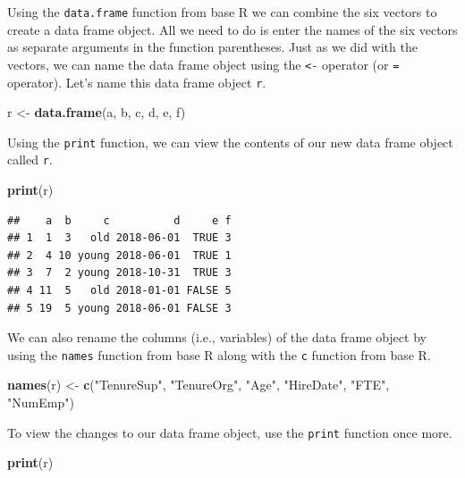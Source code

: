 \documentclass[]{book}
\newenvironment{Shaded}{\begin{snugshade}}{\end{snugshade}}
\newcommand{\KeywordTok}[1]{\textcolor[rgb]{0.13,0.29,0.53}{\textbf{#1}}}
\newcommand{\StringTok}[1]{\textcolor[rgb]{0.31,0.60,0.02}{#1}}
\newcommand{\NormalTok}[1]{#1}
\begin{document}
Using the \texttt{data.frame} function from base R we can combine the
six vectors to create a data frame object. All we need to do is enter
the names of the six vectors as separate arguments in the function
parentheses. Just as we did with the vectors, we can name the data frame
object using the \texttt{\textless{}-} operator (or \texttt{=}
operator). Let's name this data frame object \texttt{r}.

\begin{Shaded}
\begin{Highlighting}[]
\NormalTok{r <-}\StringTok{ }\KeywordTok{data.frame}\NormalTok{(a, b, c, d, e, f)}
\end{Highlighting}
\end{Shaded}

Using the \texttt{print} function, we can view the contents of our new
data frame object called \texttt{r}.

\begin{Shaded}
\begin{Highlighting}[]
\KeywordTok{print}\NormalTok{(r)}
\end{Highlighting}
\end{Shaded}

\begin{verbatim}
##    a  b     c          d     e f
## 1  1  3   old 2018-06-01  TRUE 3
## 2  4 10 young 2018-06-01  TRUE 1
## 3  7  2 young 2018-10-31  TRUE 3
## 4 11  5   old 2018-01-01 FALSE 5
## 5 19  5 young 2018-06-01 FALSE 3
\end{verbatim}

We can also rename the columns (i.e., variables) of the data frame
object by using the \texttt{names} function from base R along with the
\texttt{c} function from base R.

\begin{Shaded}
\begin{Highlighting}[]
\KeywordTok{names}\NormalTok{(r) <-}\StringTok{ }\KeywordTok{c}\NormalTok{(}\StringTok{"TenureSup"}\NormalTok{, }\StringTok{"TenureOrg"}\NormalTok{, }\StringTok{"Age"}\NormalTok{, }\StringTok{"HireDate"}\NormalTok{, }\StringTok{"FTE"}\NormalTok{, }\StringTok{"NumEmp"}\NormalTok{)}
\end{Highlighting}
\end{Shaded}

To view the changes to our data frame object, use the \texttt{print}
function once more.

\begin{Shaded}
\begin{Highlighting}[]
\KeywordTok{print}\NormalTok{(r)}
\end{Highlighting}
\end{Shaded}
\end{document}
